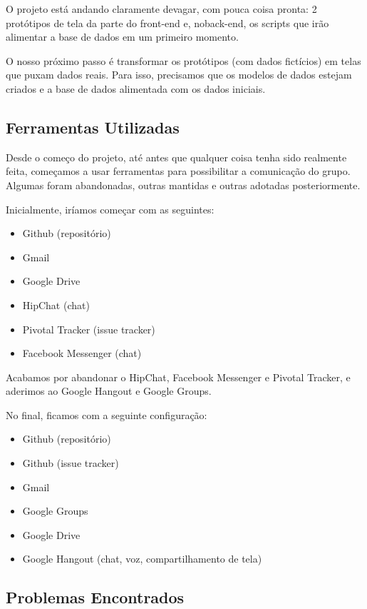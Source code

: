 \documentclass{acm_proc_article-sp}
\begin{document}
O projeto está andando claramente devagar, com pouca coisa pronta: 2 protótipos de tela da parte do front-end e,
noback-end, os scripts que irão alimentar a base de dados em um primeiro momento.

O nosso próximo passo é transformar os protótipos (com dados fictícios) em telas que puxam dados reais.
Para isso, precisamos que os modelos de dados estejam criados e a base de dados alimentada com os dados iniciais.

\subsection{Ferramentas Utilizadas}

Desde o começo do projeto, até antes que qualquer coisa tenha sido realmente feita, começamos a usar ferramentas para possibilitar
a comunicação do grupo. Algumas foram abandonadas, outras mantidas e outras adotadas posteriormente.

Inicialmente, iríamos começar com as seguintes:

\begin{itemize}
  \item Github (repositório)
  \item Gmail
  \item Google Drive
  \item HipChat (chat)
  \item Pivotal Tracker (issue tracker)
  \item Facebook Messenger (chat)
\end{itemize}

Acabamos por abandonar o HipChat, Facebook Messenger e Pivotal Tracker, e aderimos ao Google Hangout e Google Groups.

No final, ficamos com a seguinte configuração:

\begin{itemize}
  \item Github (repositório)
  \item Github (issue tracker)
  \item Gmail
  \item Google Groups
  \item Google Drive
  \item Google Hangout (chat, voz, compartilhamento de tela)
\end{itemize}

\subsection{Problemas Encontrados}
\end{document}
